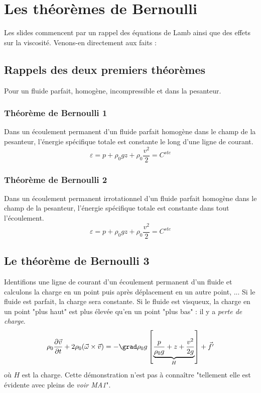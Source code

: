 	
	
\section{Les théorèmes de Bernoulli}
Les slides commencent par un rappel des équations de Lamb ainsi que des effets sur la viscosité.
Venons-en directement aux faits :
	
\subsection{Rappels des deux premiers théorèmes}
Pour un fluide parfait, homogène, incompressible et dans la pesanteur.
	
\subsubsection{Théorème de Bernoulli 1}
Dans un écoulement permanent d'un fluide parfait homogène dans le champ de la pesanteur, 
l'énergie spécifique totale est constante le long d'une ligne de courant.
\begin{equation}
	\varepsilon = p + \rho_0gz + \rho_0\frac{v^2}{2} = C^{ste}
\end{equation}
		
\subsubsection{Théorème de Bernoulli 2}
Dans un écoulement permanent irrotationnel d'un fluide parfait homogène dans le champ de 
la pesanteur, l'énergie spécifique totale est constante dans tout l'écoulement.
\begin{equation}
	\varepsilon = p + \rho_0gz + \rho_0\frac{v^2}{2} = C^{ste}
\end{equation}
		
\subsection{Le théorème de Bernoulli 3}
Identifions une ligne de courant d'un écoulement permanent d'un fluide et calculons la charge en
un point puis après déplacement en un autre point, ... Si le fluide est parfait, la charge sera
constante. Si le fluide est visqueux, la charge en un point "plus haut" est plus élevée qu'en 
un point "plus bas" : il y a \textit{perte de charge}.
\begin{equation}
	\rho_0\dfrac{\partial \vec{v}}{\partial t} + 2\rho_0(\vec{\omega}\times\vec{v}) = -\grad \rho_0g
	\left[\underbrace{\dfrac{p}{\rho_0g}+z+\dfrac{v^2}{2g}}_{H}\right] + \vec{f'}
\end{equation}
où $H$ est la charge. Cette démonstration n'est pas à connaître "tellement elle est évidente avec 
pleins de \textit{voir MA1}".\\
		

